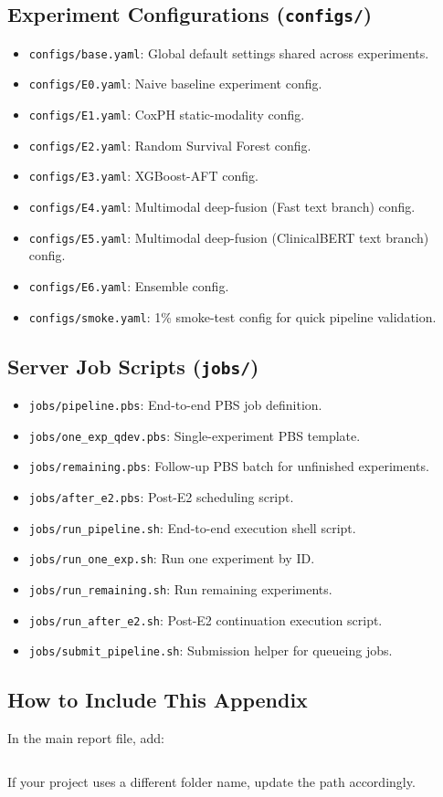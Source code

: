 \subsection{Experiment Configurations (\texttt{configs/})}
\begin{itemize}
\item \texttt{configs/base.yaml}: Global default settings shared across experiments.
\item \texttt{configs/E0.yaml}: Naive baseline experiment config.
\item \texttt{configs/E1.yaml}: CoxPH static-modality config.
\item \texttt{configs/E2.yaml}: Random Survival Forest config.
\item \texttt{configs/E3.yaml}: XGBoost-AFT config.
\item \texttt{configs/E4.yaml}: Multimodal deep-fusion (Fast text branch) config.
\item \texttt{configs/E5.yaml}: Multimodal deep-fusion (ClinicalBERT text branch) config.
\item \texttt{configs/E6.yaml}: Ensemble config.
\item \texttt{configs/smoke.yaml}: 1\% smoke-test config for quick pipeline validation.
\end{itemize}

\subsection{Server Job Scripts (\texttt{jobs/})}
\begin{itemize}
\item \texttt{jobs/pipeline.pbs}: End-to-end PBS job definition.
\item \texttt{jobs/one\_exp\_qdev.pbs}: Single-experiment PBS template.
\item \texttt{jobs/remaining.pbs}: Follow-up PBS batch for unfinished experiments.
\item \texttt{jobs/after\_e2.pbs}: Post-E2 scheduling script.
\item \texttt{jobs/run\_pipeline.sh}: End-to-end execution shell script.
\item \texttt{jobs/run\_one\_exp.sh}: Run one experiment by ID.
\item \texttt{jobs/run\_remaining.sh}: Run remaining experiments.
\item \texttt{jobs/run\_after\_e2.sh}: Post-E2 continuation execution script.
\item \texttt{jobs/submit\_pipeline.sh}: Submission helper for queueing jobs.
\end{itemize}

\subsection{How to Include This Appendix}
In the main report file, add:
\begin{verbatim}

\end{verbatim}

If your project uses a different folder name, update the path accordingly.

